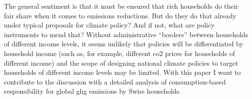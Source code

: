 \documentclass[referee, lineno, pdflatex,sn-apa]{sn-jnl}%
\theoremstyle{thmstyleone}%
\theoremstyle{thmstyletwo}%
\theoremstyle{thmstylethree}%
\begin{document}
The general sentiment is that it must be ensured that rich households do their fair share when it comes to emissions reductions.
But do they do that already under typical proposals for climate policy?
And if not, what are policy instruments to mend that?
Without administrative ``borders'' between households of different income levels, it seems unlikely that policies will be differentiated by household income (such as, for example, different \ac{co2} prices for households of different income) and the scope of designing national climate policies to target households of different income levels may be limited.
With this paper I want to contribute to the discussion with a detailed analysis of consumption-based responsibility for global \ac{ghg} emissions by Swiss households.
\end{document}
